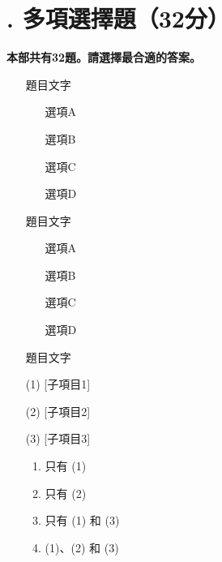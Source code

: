 \documentclass[12pt,a4paper]{article}
\newcommand{\answerline}[1]{\underline{\hspace{#1}}}
\newcommand{\mcqscore}{32}                 %
\newcommand{\mcqcount}{32}                 %
\begin{document}
\section{\textbf{\fontsize{12pt}{14.4pt}. 多項選擇題（\mcqscore{}分）}}

\textbf{\fontsize{12pt}{14.4pt}\selectfont 本部共有\mcqcount{}題。請選擇最合適的答案。}

\fontsize{12pt}{14.4pt}\selectfont

\begin{enumerate}

\item [題目文字]

\begin{enumerate}[label=\Alph*.]
\item [選項A]
\item [選項B]
\item [選項C]
\item [選項D]
\end{enumerate}

\item [題目文字] \answerline{2cm}

\begin{enumerate}[label=\Alph*.]
\item [選項A]
\item [選項B]
\item [選項C]
\item [選項D]
\end{enumerate}

\item [題目文字]

(1) [子項目1]

(2) [子項目2]

(3) [子項目3]

\begin{enumerate}[label=\Alph*.]
\item 只有 (1)
\item 只有 (2)
\item 只有 (1) 和 (3)
\item (1)、(2) 和 (3)
\end{enumerate}


\end{enumerate}
\end{document}
